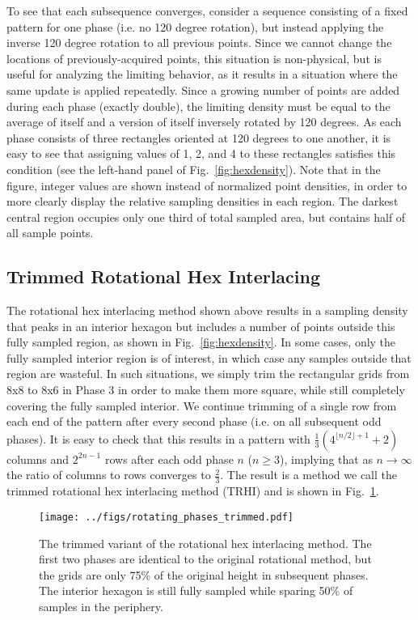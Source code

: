 \documentclass{article}
\newcommand{\reffig}[1]{Fig.~\ref{fig:#1}}
\begin{document}
To see that each subsequence converges, consider a sequence consisting of a
fixed pattern for one phase (i.e. no 120 degree rotation), but instead applying
the inverse 120 degree rotation to all previous points.
%
Since we cannot change the locations of previously-acquired points, this
situation is non-physical, but is useful for analyzing the limiting behavior,
as it results in a situation where the same update is applied repeatedly.
%
Since a growing number of points are added during each phase (exactly double),
the limiting density must be equal to the average of itself and a version of
itself inversely rotated by 120 degrees.
%
As each phase consists of three rectangles oriented at 120 degrees to one
another, it is easy to see that assigning values of 1, 2, and 4 to these
rectangles satisfies this condition (see the left-hand panel of
\reffig{hexdensity}).
%
Note that in the figure, integer values are shown instead of normalized point
densities, in order to more clearly display the relative sampling densities in
each region.
%
The darkest central region occupies only one third of total sampled area, but
contains half of all sample points.
%

\subsection{Trimmed Rotational Hex Interlacing}
\label{sec:trimmed}

The rotational hex interlacing method shown above results in a sampling density that peaks in an interior hexagon but includes a number of points outside this fully sampled region, as shown in \reffig{hexdensity}.
%
In some cases, only the fully sampled interior region is of interest, in which case any samples outside that region are wasteful.
%
In such situations, we simply trim the rectangular grids from 8x8 to 8x6 in
Phase 3 in order to make them more square, while still completely covering the
fully sampled interior.
%
We continue trimming of a single row from each end of the pattern after
every second phase (i.e. on all subsequent odd phases).
%
It is easy to check that this results in a pattern with
$\frac{1}{3}\left(4^{\lfloor n/2\rfloor + 1} + 2\right)$ columns and $2^{2n -
1}$ rows after each odd phase $n$ ($n\ge 3$), implying that as $n\to\infty$ the
ratio of columns to rows converges to $\frac{2}{3}$.
%
The result is a method we call the trimmed rotational hex interlacing method
(TRHI) and is shown in \reffig{trimmedrotatingphases}.


\begin{figure}[ht]
\centering
\texttt{[image: ../figs/rotating\_phases\_trimmed.pdf]}
\caption{
\label{fig:trimmedrotatingphases} 
The trimmed variant of the rotational hex interlacing method.
%
The first two phases are identical to the original rotational method, but the grids are only 75\% of the original height in subsequent phases.
%
The interior hexagon is still fully sampled while sparing 50\% of samples in the periphery.
}
\end{figure}
\end{document}

